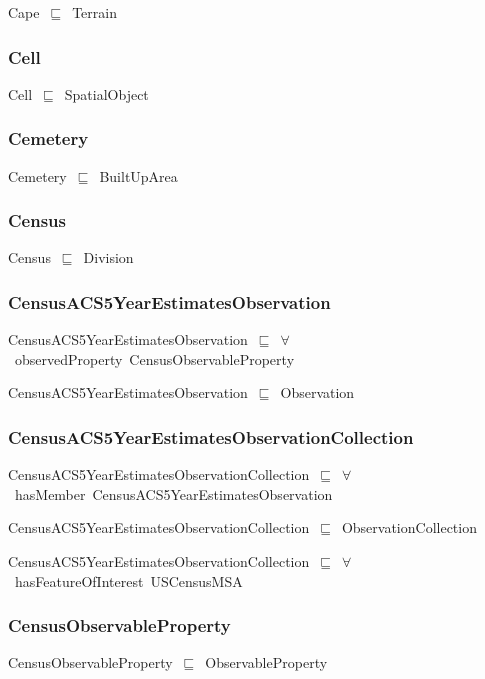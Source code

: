 \documentclass{article}
\begin{document}
Cape~\ensuremath{\sqsubseteq}~Terrain~

\subsubsection*{Cell}

Cell~\ensuremath{\sqsubseteq}~SpatialObject~

\subsubsection*{Cemetery}

Cemetery~\ensuremath{\sqsubseteq}~BuiltUpArea~

\subsubsection*{Census}

Census~\ensuremath{\sqsubseteq}~Division~

\subsubsection*{CensusACS5YearEstimatesObservation}

CensusACS5YearEstimatesObservation~\ensuremath{\sqsubseteq}~\ensuremath{\forall}~observedProperty~CensusObservableProperty~

CensusACS5YearEstimatesObservation~\ensuremath{\sqsubseteq}~Observation~

\subsubsection*{CensusACS5YearEstimatesObservationCollection}

CensusACS5YearEstimatesObservationCollection~\ensuremath{\sqsubseteq}~\ensuremath{\forall}~hasMember~CensusACS5YearEstimatesObservation~

CensusACS5YearEstimatesObservationCollection~\ensuremath{\sqsubseteq}~ObservationCollection~

CensusACS5YearEstimatesObservationCollection~\ensuremath{\sqsubseteq}~\ensuremath{\forall}~hasFeatureOfInterest~USCensusMSA~

\subsubsection*{CensusObservableProperty}

CensusObservableProperty~\ensuremath{\sqsubseteq}~ObservableProperty~
\end{document}
